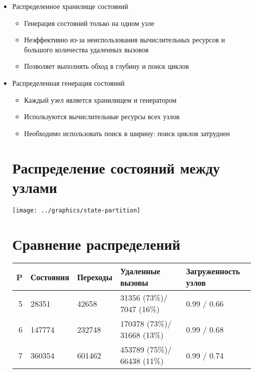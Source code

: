 \documentclass[12pt]{article}
\begin{document}
\begin{itemize}
\item Распределенное хранилище состояний
  \begin{itemize}
  \item Генерация состояний только на одном узле
  \item Неэффективно из-за неиспользования вычислительных ресурсов и большого количества
    удаленных вызовов
  \item Позволяет выполнять обход в глубину и поиск циклов
  \end{itemize}

\item Распределенная генерация состояний
  \begin{itemize}
  \item Каждый узел является хранилищем и генератором
  \item Используются вычислительные ресурсы всех узлов
  \item Необходимо использовать поиск в ширину: поиск циклов затруднен
  \end{itemize}

\section{Распределение состояний между узлами}
\label{sec:state-partitioning}

\texttt{[image: ../graphics/state-partition]}

\section{Сравнение распределений}
\label{sec:partition-compare}

\begin{tabular}[ht]{|r|l|l|p{}|p{}|}
  \hline 
  P & Состояния & Переходы & Удаленные вызовы & Загруженность узлов    \\ \hline
  5 & 28351     & 42658    & 31356  (73\%)/ 7047  (16\%) & 0.99 / 0.66 \\ \hline
  6 & 147774    & 232748   & 170378 (73\%)/ 31668 (13\%) & 0.99 / 0.68 \\ \hline
  7 & 360354    & 601462   & 453789 (75\%)/ 66438 (11\%) & 0.99 / 0.74 \\ \hline
\end{tabular}

\end{itemize}
\end{document}
